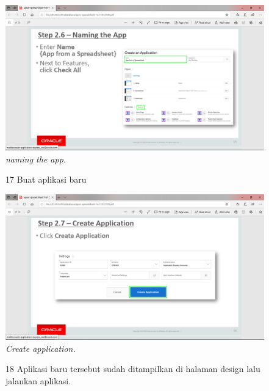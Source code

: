 \begin{enumerate}
\begin{figure}
    \begin{center}
\includegraphics[scale=0.3]{figures/pic(9).png}
    \caption{\textit{naming the app.}}
        \end{center}
\label{gambar}
\end{figure}

\begin{figure}
\item[17] Buat aplikasi baru

    \begin{center}
\includegraphics[scale=0.3]{figures/pic(10).png}
    \caption{\textit{Create application.}}
        \end{center}
\label{gambar}
\end{figure}

\begin{figure}
\item[18] Aplikasi baru tersebut sudah ditampilkan di halaman design lalu jalankan aplikasi.


\end{figure}
\end{enumerate}
